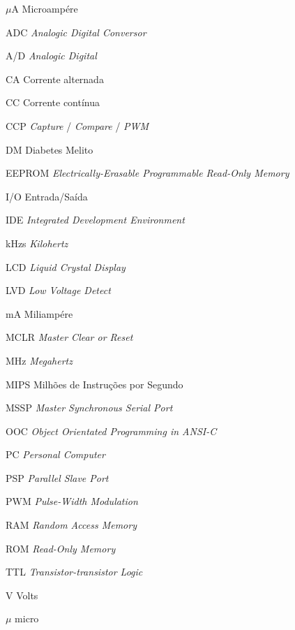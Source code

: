 \documentclass[	12pt, Times, openright, twoside, a4paper, english, brazil]{abntex2}
\begin{document}
\begin{siglas}
  \item[$\mu$A] Microampére
  \item[ADC] \emph{Analogic Digital Conversor}
  \item[A/D] \emph{Analogic Digital}
  \item[CA] Corrente alternada
  \item[CC] Corrente contínua
  \item[CCP] \emph{Capture} / \emph{Compare} / \emph{PWM}
  \item[DM] Diabetes Melito
  \item[EEPROM] \emph{Electrically-Erasable Programmable Read-Only Memory}
  \item[I/O] Entrada/Saída
  \item[IDE] \emph{Integrated Development Environment}
  \item[kHzs] \emph{Kilohertz}
  \item[LCD] \emph{Liquid Crystal Display}
  \item[LVD] \emph{Low Voltage Detect}
  \item[mA] Miliampére
  \item[MCLR] \emph{Master Clear or Reset}
  \item[MHz] \emph{Megahertz}
  \item[MIPS] Milhões de Instruções por Segundo
  \item[MSSP] \emph{Master Synchronous Serial Port}
  \item[OOC]  \emph{Object Orientated Programming in ANSI-C}
  \item[PC] \emph{Personal Computer}
  \item[PSP] \emph{Parallel Slave Port}
  \item[PWM] \emph{Pulse-Width Modulation}
  \item[RAM] \emph{Random Access Memory}          
  \item[ROM] \emph{Read-Only Memory}
  \item[TTL] \emph{Transistor-transistor Logic}
  \item[V] Volts  
\end{siglas}

\begin{simbolos}
  \item[$ \mu $] micro
\end{simbolos}

\tableofcontents*
\cleardoublepage
\end{document}
